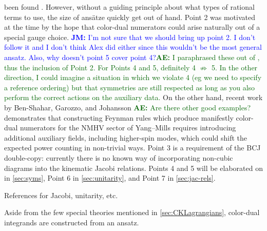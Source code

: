 \documentclass[11pt,letter]{article}
\newcommand{\ace}[1]{\textcolor{darkgreen}{\textbf{AE:}{ #1}}}
\newcommand{\jm}[1]{\textcolor{blue}{\textbf{JM: }{#1}}}
\begin{document}
been found
\cite{Square,WeinzierlBCJLagrangian,Mogull:2015adi,FivePointN4BCJ,Johansson:2017bfl}.
However, without a guiding principle about what types of rational
terms to use, the size of ans\"{a}tze quickly get out of hand.  Point
2 was motivated at the time by the hope that color-dual numerators
could arise naturally out of a special gauge choice. \jm{I'm not sure
  that we should bring up point 2.  I don't follow it and I don't
  think Alex did either since this wouldn't be the most general
  ansatz.  Also, why doesn't point 5 cover point 4?}\ace{I paraphrased
  these out of \cite{Bern:2015ooa}, thus the inclusion of Point 2.
  For Points 4 and 5, definitely 4 $\not \Rightarrow$ 5.  In the other
  direction, I could imagine a situation in which we violate 4 (eg we
  need to specify a reference ordering) but that symmetries are still
  respected as long as you also perform the correct actions on the
  auxiliary data.} On the other hand, recent work by Ben-Shahar,
Garozzo, and Johansson \cite{Ben-Shahar:2022ixa} \ace{Are there other
  good examples?}  demonstrates that constructing Feynman rules which
produce manifestly color-dual numerators for the NMHV sector of
Yang--Mills requires introducing additional auxiliary fields,
including higher-spin modes, which could shift the expected power
counting in non-trivial ways.  Point 3 is a requirement of the BCJ
double-copy: currently there is no known way of incorporating
non-cubic diagrams into the kinematic Jacobi relations.  Points 4 and
5 will be elaborated on in \cref{sec:syms}, Point 6 in
\cref{sec:unitarity}, and Point 7 in \cref{sec:jac-rels}.


References for Jacobi, unitarity, etc.

Aside from the few special theories mentioned in \cref{sec:CKLagrangians}, color-dual integrands are constructed from an ansatz.
\end{document}
